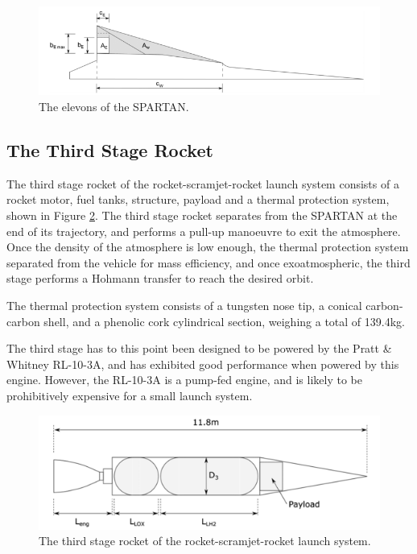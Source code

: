 \begin{figure}
\centering
\includegraphics[width=0.7\linewidth]{figures/2_literature-review/SPARTANElevons}
\caption{The elevons of the SPARTAN\cite{Preller2017}.}
\label{fig:SPARTANElevons}
\end{figure}


\subsection{The Third Stage Rocket}
The third stage rocket of the rocket-scramjet-rocket launch system consists of a rocket motor, fuel tanks, structure, payload and a thermal protection system\cite{Preller2017}, shown in Figure \ref{fig:ThirdStage}. 
The third stage rocket separates from the SPARTAN at the end of its trajectory, and performs a pull-up manoeuvre to exit the atmosphere. Once the density of the atmosphere is low enough, the thermal protection system separated from the vehicle for mass efficiency, and once exoatmospheric, the third stage performs a Hohmann transfer to reach the desired orbit. 

The thermal protection system consists of a tungsten nose tip, a conical carbon-carbon shell, and a phenolic cork cylindrical section, weighing a total of 139.4kg. 

The third stage has to this point been designed to be powered by the Pratt \& Whitney RL-10-3A\cite{Preller2017}, and has exhibited good performance when powered by this engine. However, the RL-10-3A is a pump-fed engine, and is likely to be prohibitively expensive for a small launch system. 

 


\begin{figure}
\centering
\includegraphics[width=0.7\linewidth]{figures/2_literature-review/ThirdStage}
\caption{The third stage rocket of the rocket-scramjet-rocket launch system\cite{Preller2017}.}
\label{fig:ThirdStage}
\end{figure}

